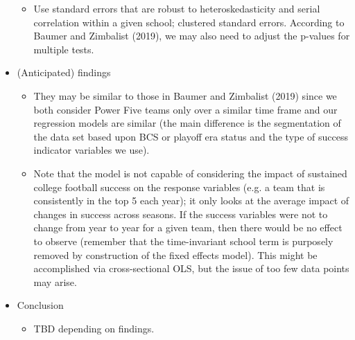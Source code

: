\documentclass[12pt,english]{article}
\begin{document}
\begin{itemize}
\begin{itemize}
    \item Use standard errors that are robust to heteroskedasticity and serial correlation within a given school; clustered standard errors. According to Baumer and Zimbalist (2019), we may also need to adjust the p-values for multiple tests.
    \end{itemize}
\item (Anticipated) findings
    \begin{itemize}
    \item They may be similar to those in Baumer and Zimbalist (2019) since we both consider Power Five teams only over a similar time frame and our regression models are similar (the main difference is the segmentation of the data set based upon BCS or playoff era status and the type of success indicator variables we use).
    \item Note that the model is not capable of considering the impact of sustained college football success on the response variables (e.g. a team that is consistently in the top 5 each year); it only looks at the average impact of changes in success across seasons. If the success variables were not to change from year to year for a given team, then there would be no effect to observe (remember that the time-invariant school term is purposely removed by construction of the fixed effects model). This might be accomplished via cross-sectional OLS, but the issue of too few data points may arise.
    \end{itemize}
\item Conclusion
    \begin{itemize}
    \item TBD depending on findings.
    \end{itemize}
\end{itemize}


\nocite{*}

\end{document}
